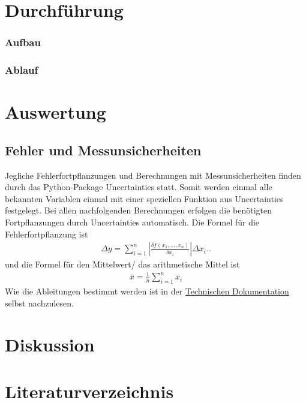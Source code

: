 \documentclass[12pt]{article}
\begin{document}
\section{Durchführung}
\subsubsection{Aufbau}
\subsubsection{Ablauf}

\section{Auswertung}
\subsection{Fehler und Messunsicherheiten}
Jegliche Fehlerfortpflanzungen und Berechnungen mit Messunsicherheiten finden durch das Python-Package Uncertainties\cite{uncertainties} statt. Somit werden einmal alle bekannten Variablen einmal mit einer speziellen Funktion aus Uncertainties festgelegt. Bei allen nachfolgenden Berechnungen erfolgen die benötigten Fortpflanzungen durch Uncertainties automatisch. Die Formel für die Fehlerfortpflanzung ist 
\begin{align}
  \Delta y=\sum_{i=1}^n\left|\frac{\delta f\left(x_1, \ldots, x_n\right)}{\delta x_i}\right| \Delta x_i.\text{.}\label{gauss}
\end{align}
und die Formel für den Mittelwert/ das arithmetische Mittel ist
\begin{align}
  \bar{x}=\frac{1}{n}\sum_{i=1}^n x_i\label{mittel}
\end{align}
Wie die Ableitungen bestimmt werden ist in der \href{https://readthedocs.org/projects/uncertainties-python-package/downloads/pdf/latest/}{Technischen Dokumentation} selbst nachzulesen.

\section{Diskussion}
\newpage

\section{Literaturverzeichnis}
\printbibliography[heading = none]
\newpage
\end{document}
